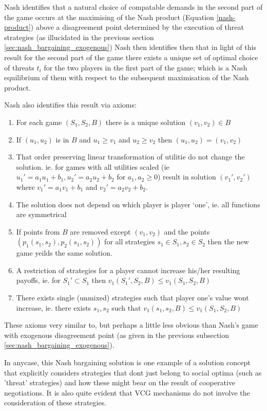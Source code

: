 Nash identifies that a natural choice of compatable demands in the second part of the game occurs at the maximising of the Nash product (Equation \ref{nash-product}) above a disagreement point determined by the execution of threat strategies (as illucidated in the previous section \ref{sec:nash_bargaining_exogenous})
Nash then identifies then that in light of this result for the second part of the game there exists a unique set of optimal choice of threats $t_i$ for the two players in the first part of the game; which is a Nash equilibrium of them with respect to the subsequent maximisation of the Nash product.

Nash also identifies this result via axioms:
\begin{enumerate}
\item For each game $(S_1,S_2,B)$ there is a unique solution $(v_1,v_2) \in B$
\item If $(u_1,u_2)$ is in $B$ and $u_1\ge v_1$ and $u_2\ge v_2$ then $(u_1,u_2)=(v_1,v_2)$
\item That order preserving linear transformation of utilitie do not change the solution. ie. for games with all utilities scaled (ie $u_1' = a_1u_1+b_1, u_2' = a_2u_2+b_2$ for $a_1,a_2\ge 0$) result in solution $(v_1',v_2')$ where $v_1'=a_1v_1+b_1$ and $v_2'=a_2v_2+b_2$.
\item The solution does not depend on which player is player `one', ie. all functions are symmetrical
\item If points from $B$ are removed except $(v_1,v_2)$ and the points $(p_1(s_1,s_2), p_2(s_1,s_2))$ for all strategies $s_1\in S_1,s_2\in S_2$ then the new game yeilds the same solution.
\item A restriction of strategies for a player cannot increase his/her resulting payoffs, ie. for $S_1'\subset S_1$ then $v_1(S_1',S_2,B)\le v_1(S_1,S_2,B)$
\item There exists single (unmixed) strategies such that player one's value wont increase, ie. there exists $s_1,s_2$ such that $v_1(s_1,s_2,B)\le v_1(S_1,S_2,B)$
\end{enumerate}

These axioms very similar to, but perhaps a little less obvious than Nash's game with exogenous disagreement point (as given in the previous subsection \ref{sec:nash_bargaining_exogenous}).

In anycase, this Nash bargaining solution is one example of a solution concept that explicitly considers strategies that dont just belong to social optima (such as 'threat' strategies) and how these might bear on the result of cooperative negotiations.
It is also quite evident that VCG mechanisms do not involve the consideration of these strategies.


